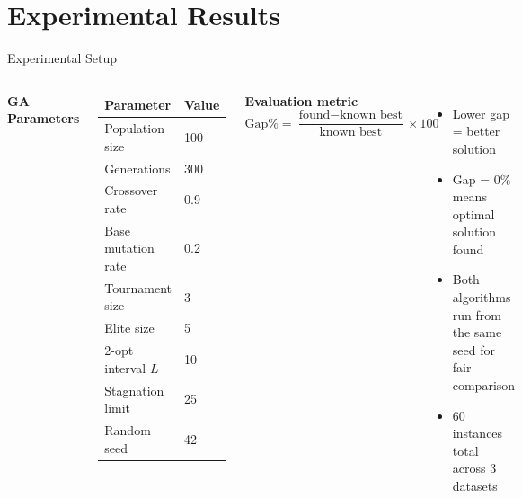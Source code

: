\documentclass[aspectratio=169]{beamer}
\begin{document}
\section{Experimental Results}

\begin{frame}{Experimental Setup}
  \begin{columns}
    \textbf{GA Parameters}
    \begin{center}
    \begin{tabular}{ll}
      \toprule
      Parameter & Value \\
      \midrule
      Population size     & 100  \\
      Generations         & 300  \\
      Crossover rate      & 0.9  \\
      Base mutation rate  & 0.2  \\
      Tournament size     & 3    \\
      Elite size          & 5    \\
      2-opt interval $L$  & 10   \\
      Stagnation limit    & 25   \\
      Random seed         & 42   \\
      \bottomrule
    \end{tabular}
    \end{center}

    \textbf{Evaluation metric}
    \[
      \text{Gap\%} = \frac{\text{found} - \text{known best}}{\text{known best}} \times 100
    \]
    \begin{itemize}
      \item Lower gap = better solution
      \item Gap = 0\% means optimal solution found
      \item Both algorithms run from the same seed for fair comparison
      \item 60 instances total across 3 datasets
    \end{itemize}
  \end{columns}
\end{frame}
\end{document}
